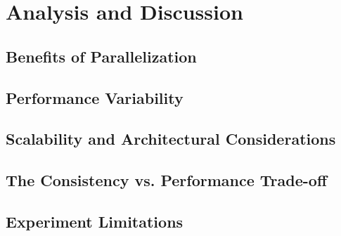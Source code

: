 \chapter{Analysis and Discussion}
\label{ch07:discussion}

\section{Benefits of Parallelization}

\section{Performance Variability}
\section{Scalability and Architectural Considerations}
\section{The Consistency vs. Performance Trade-off}

\section{Experiment Limitations}
